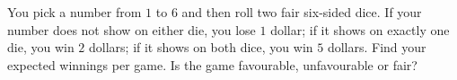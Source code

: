 You pick a number from $1$ to $6$ and then roll two fair six-sided dice. If your number does not show on either die, you lose $1$ dollar; if it shows on exactly one die, you win $2$ dollars; if it shows on both dice, you win $5$ dollars. Find your expected winnings per game. Is the game favourable, unfavourable or fair?
